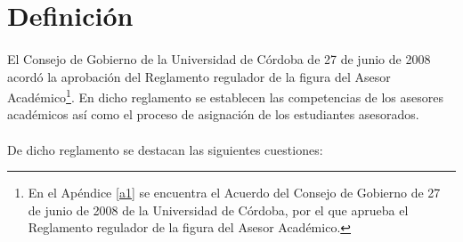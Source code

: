 \section{Definición}

\paragraph{}El Consejo de Gobierno de la Universidad de Córdoba de 27 de junio
de 2008 acordó la aprobación del Reglamento regulador de la figura del Asesor
Académico\footnote{En el Apéndice \ref{a1} se encuentra el Acuerdo del Consejo
de Gobierno de 27 de junio de 2008 de la Universidad de Córdoba, por el que
aprueba el Reglamento regulador de la figura del Asesor Académico.}. En dicho
reglamento se establecen las competencias de los asesores académicos así como el
proceso de asignación de los estudiantes asesorados.

\paragraph{}De dicho reglamento se destacan las siguientes cuestiones:

